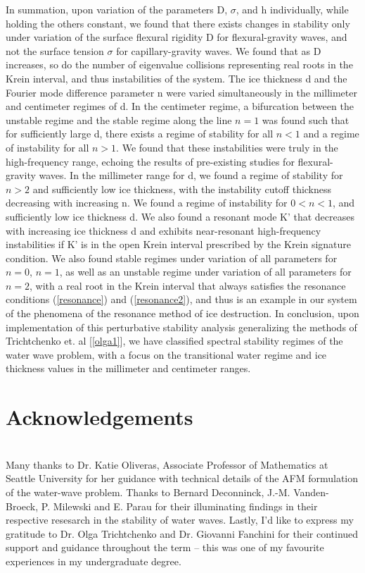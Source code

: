 \documentclass{article}
\begin{document}
In summation, upon variation of the parameters D, \(\sigma\), and h individually, while holding the others constant, we found that there exists changes in stability only under variation of the surface flexural rigidity D for flexural-gravity waves, and not the surface tension \(\sigma\) for capillary-gravity waves. We found that as D increases, so do the number of eigenvalue collisions representing real roots in the Krein interval, and thus instabilities of the system. The ice thickness d and the Fourier mode difference parameter n were varied simultaneously in the millimeter and centimeter regimes of d. In the centimeter regime, a bifurcation between the unstable regime and the stable regime along the line \(n = 1\) was found such that for sufficiently large d, there exists a regime of stability for all \(n<1\) and a regime of instability for all \(n>1\). We found that these instabilities were truly in the  high-frequency range, echoing the results of pre-existing studies for flexural-gravity waves. In the millimeter range for d, we found a regime of stability for \(n>2\) and sufficiently low ice thickness, with the instability cutoff thickness decreasing with increasing n. We found a regime of instability for \(0 < n < 1\), and sufficiently low ice thickness d. We also found a resonant mode K' that decreases with increasing ice thickness d and exhibits near-resonant high-frequency instabilities if K' is in the open Krein interval prescribed by the Krein signature condition. We also found stable regimes under variation of all parameters for \(n = 0\), \(n = 1\), as well as an unstable regime under variation of all parameters for \(n = 2\), with a real root in the Krein interval that always satisfies the resonance conditions (\ref{resonance}) and (\ref{resonance2}), and thus is an example in our system of the phenomena of the resonance method of ice destruction. In conclusion, upon implementation of this perturbative stability analysis generalizing the methods of Trichtchenko et. al [\ref{olga1}], we have classified spectral stability regimes of the water wave problem, with a focus on the transitional water regime and ice thickness values in the millimeter and centimeter ranges.
\\

\section{Acknowledgements}
\\ 
Many thanks to Dr. Katie Oliveras, Associate Professor of Mathematics at Seattle University for her guidance with technical details of the AFM formulation of the water-wave problem. Thanks to Bernard Deconninck, J.-M. Vanden-Broeck, P. Milewski and E. Parau for their illuminating findings in their respective resesarch in the stability of water waves. Lastly, I'd like to express my gratitude to Dr. Olga Trichtchenko and Dr. Giovanni Fanchini for their continued support and guidance throughout the term -- this was one of my favourite experiences in my undergraduate degree.
\end{document}
